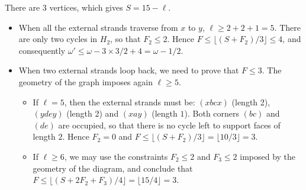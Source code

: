 \documentclass[10pt]{article}
\theoremstyle{plain}
\theoremstyle{definition}
\begin{document}
There are $3$ vertices, which gives $S = 15 - \ell$. 

\begin{itemize}

\item When all the external strands traverse from $x$ to $y$, $\ell \geq 2 +2+1= 5$. There are only two cycles in $H_2$, so that $F_2 \leq 2$. Hence $F \leq \lfloor (S + F_2 )/3 \rfloor \leq 4$, and consequently $\omega' \leq \omega - 3 \times 3/2 + 4 = \omega - 1/2$.

\item When two external strands loop back, we need to prove that $F \leq 3$. The geometry of the graph imposes again $\ell \geq 5$. 
\begin{itemize}
\item If $\ell = 5$, then the external strands must be: $(xbcx)$ (length 2), $(ydey)$ (length 2) and  $(xay)$ (length $1$). Both corners $(bc)$ and $(de)$ are occupied, so that there is no cycle left to support faces of length $2$. Hence $F_2 = 0$ and $F \leq \lfloor (S + F_2 )/3 \rfloor = \lfloor 10/3 \rfloor = 3$. 

\item If $\ell \geq 6$, we may use the constraints $F_2 \leq 2$ and 
$F_3 \leq 2$ imposed by the geometry of the diagram, and conclude that $F \leq \lfloor ( S + 2 F_2 + F_3) /4 \rfloor = \lfloor 15/4 \rfloor = 3$.
\end{itemize}

\end{itemize}

\
\end{document}

